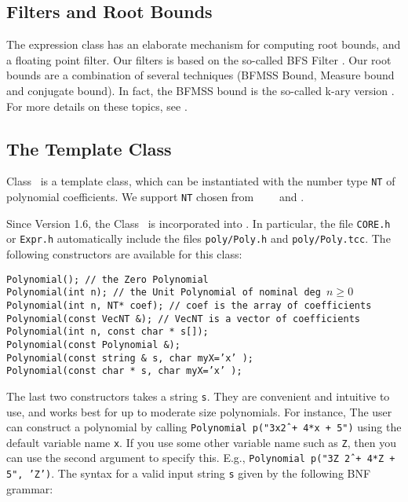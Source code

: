 \subsection{Filters and Root Bounds}
\label{sec-expr-filters}
The expression class has
an elaborate mechanism for computing root bounds,
and a floating point filter.
Our filters is based on the so-called BFS Filter \cite{bfs:exact-cascaded:01}.
Our root bounds are a combination of several techniques
(BFMSS Bound, Measure bound and conjugate bound).
In fact, the BFMSS bound is the so-called k-ary version
\cite{pion-yap:kary:03}.  For more details on these topics, see
\cite{li-pion-yap:progress:04}.


\subsection{The Template Class \Poly}

Class \Poly\ is a template class, which can be instantiated with the 
number type {\tt NT} of polynomial coefficients.   
We support {\tt NT} chosen from \int\, \Int\, \BF\, \Rat\ and \expr.

Since Version 1.6, the Class \Poly\ is incorporated into \corelib.
In particular, the file \texttt{CORE.h} or \texttt{Expr.h} automatically
include the files \texttt{poly/Poly.h} and \texttt{poly/Poly.tcc}.
The following constructors are available for this class:

\begin{progb}{
\> \tt Polynomial();    // the Zero Polynomial \\
\> \tt Polynomial(int n);   // the Unit Polynomial of nominal deg $n\ge 0$ \\
\> \tt Polynomial(int n, NT* coef); // coef is the array of coefficients\\
\> \tt Polynomial(const VecNT \&); // VecNT is a vector of coefficients\\
\> \tt Polynomial(int n, const char * s[]);\\
\> \tt Polynomial(const Polynomial \&); \\
\> \tt Polynomial(const string \& s, char myX='x' );\\
\> \tt Polynomial(const char * s, char myX='x' ); 
}\end{progb}

The last two constructors takes a string {\tt s}.
They are convenient and intuitive to use, and 
works best for up to moderate size polynomials.
For instance, The user can construct a polynomial
by calling \mbox{\tt Polynomial p("3x\^2 + 4*x + 5")} using
the default variable name {\tt x}.  If you use some
other variable name such as {\tt Z}, then you can use
the second argument to specify this.  E.g.,
\mbox{\tt Polynomial p("3Z \^2 + 4*Z  + 5", 'Z')}.
The syntax for a valid input string {\tt s} given by the following
BNF grammar:

